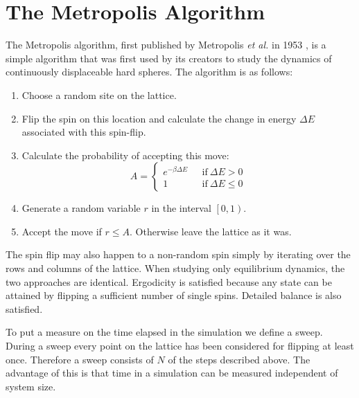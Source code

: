 \documentclass[11pt, a4paper]{report} %
\begin{document}
\section{The Metropolis Algorithm}
The Metropolis algorithm, first published by Metropolis \textit{et al.} in 1953 \cite{metropolis:1953}, is a simple algorithm that was first used by its creators to study the dynamics of continuously displaceable hard spheres.
The algorithm is as follows\cite{binney:1992}:
\begin{enumerate}
	\item Choose a random site on the lattice.
	\item Flip the spin on this location and calculate the change in energy \(\Delta E\) associated with this spin-flip.
	\item Calculate the probability of accepting this move:
	\begin{equation}
		A =
		\begin{cases}
			e^{-\beta \Delta E}\ \ \ &\mathrm{if}\ \Delta E > 0 \\
			1 \ \ \ &\mathrm{if}\ \Delta E \leq 0
		\end{cases}
	\end{equation}
	\item Generate a random variable \(r\) in the interval \(\left[0, 1\right)\).
	\item Accept the move if \(r \leq A\). Otherwise leave the lattice as it was.
\end{enumerate}
The spin flip may also happen to a non-random spin simply by iterating over the rows and columns of the lattice. When studying only equilibrium dynamics, the two approaches are identical.\cite{landau:2015}
Ergodicity is satisfied because any state can be attained by flipping a sufficient number of single spins. Detailed balance is also satisfied.

To put a measure on the time elapsed in the simulation we define a sweep.
During a sweep every point on the lattice has been considered for flipping at least once.
Therefore a sweep consists of \(N\) of the steps described above.
The advantage of this is that time in a simulation can be measured independent of system size.\cite{newman:1999}
\end{document}
